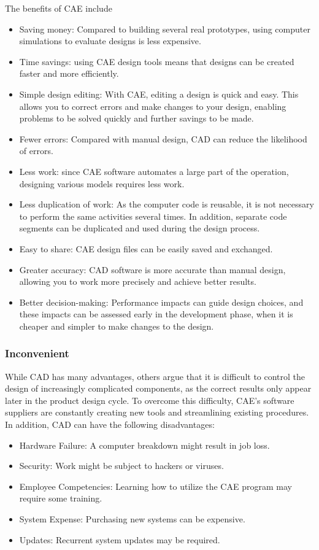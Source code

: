     The benefits of CAE include
    \begin{itemize}
        \item Saving money: Compared to building several real prototypes, using computer simulations to evaluate designs is less expensive.
        \item Time savings: using CAE design tools means that designs can be created faster and more efficiently.
        \item Simple design editing: With CAE, editing a design is quick and easy. This allows you to correct errors and make changes to your design, enabling problems to be solved quickly and further savings to be made.
        \item Fewer errors: Compared with manual design, CAD can reduce the likelihood of errors.
        \item Less work: since CAE software automates a large part of the operation, designing various models requires less work.
        \item Less duplication of work: As the computer code is reusable, it is not necessary to perform the same activities several times. In addition, separate code segments can be duplicated and used during the design process.
        \item Easy to share: CAE design files can be easily saved and exchanged.
        \item Greater accuracy: CAD software is more accurate than manual design, allowing you to work more precisely and achieve better results.
        \item Better decision-making: Performance impacts can guide design choices, and these impacts can be assessed early in the development phase, when it is cheaper and simpler to make changes to the design.
    \end{itemize}

    \subsubsection{Inconvenient}
    While CAD has many advantages, others argue that it is difficult to control the design of increasingly complicated components, as the correct results only appear later in the product design cycle. To overcome this difficulty, CAE's software suppliers are constantly creating new tools and streamlining existing procedures. In addition, CAD can have the following disadvantages:

    \begin{itemize}
        \item Hardware Failure: A computer breakdown might result in job loss.
        \item Security: Work might be subject to hackers or viruses.
        \item Employee Competencies: Learning how to utilize the CAE program may require some training.
        \item System Expense: Purchasing new systems can be expensive.
        \item Updates: Recurrent system updates may be required.
    \end{itemize}


